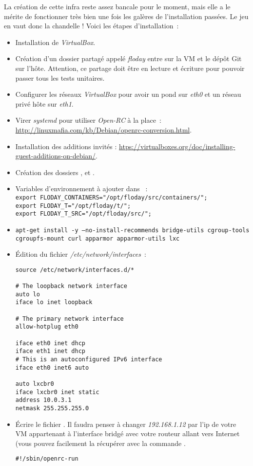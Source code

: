 La création de cette infra reste assez bancale pour le moment, mais elle a le mérite de fonctionner très bien une fois les galères de l'installation passées.
Le jeu en vaut donc la chandelle !
Voici les étapes d'installation~:
\begin{itemize}
	\item Installation de \emph{VirtualBox}.
	\item Création d'un dossier partagé appelé \emph{floday} entre  sur la VM et le dépôt Git sur l'hôte. Attention, ce partage doit être en lecture et écriture pour pouvoir passer tous les tests unitaires.
	\item Configurer les réseaux \emph{VirtualBox} pour avoir un pond sur \emph{eth0} et un réseau privé hôte sur \emph{eth1}.
	\item Virer \emph{systemd} pour utiliser \emph{Open-RC} à la place~: \url{http://linuxmafia.com/kb/Debian/openrc-conversion.html}.
	\item Installation des additions invités : \url{htps://virtualboxes.org/doc/installing-guest-additions-on-debian/}.
	\item Création des dossiers ,  et .
	\item Variables d'environnement à ajouter dans ~:\\
{\tt export FLODAY\_CONTAINERS="/opt/floday/src/containers/";\\
export FLODAY\_T="/opt/floday/t/";\\
export FLODAY\_T\_SRC="/opt/floday/src/";}
	\item {\tt{}apt-get install -y --no-install-recommends bridge-utils cgroup-tools\\
		cgroupfs-mount curl apparmor apparmor-utils lxc}
	\item Édition du fichier \emph{/etc/network/interfaces}~:\\
		\begin{lstlisting}
source /etc/network/interfaces.d/*

# The loopback network interface
auto lo
iface lo inet loopback

# The primary network interface
allow-hotplug eth0

iface eth0 inet dhcp
iface eth1 inet dhcp
# This is an autoconfigured IPv6 interface
iface eth0 inet6 auto

auto lxcbr0
iface lxcbr0 inet static
address 10.0.3.1
netmask 255.255.255.0
		\end{lstlisting}
	\item Écrire le fichier .
		Il faudra penser à changer \emph{192.168.1.12} par l'ip de votre VM appartenant à l'interface bridgé avec votre routeur allant vers Internet (vous pouvez facilement la récupérer avec la commande .\\
	\begin{lstlisting}
#!/sbin/openrc-run


\end{lstlisting}
\end{itemize}
